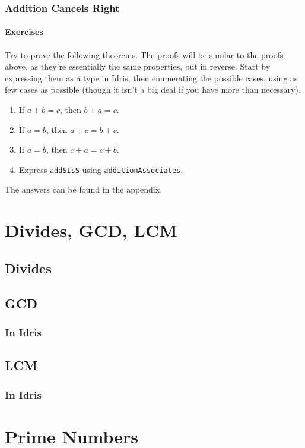 \documentclass{article}
\newcommand{\inline}[1]{\texttt{#1}}
\begin{document}
\subsubsection{Addition Cancels Right}

\paragraph{Exercises}
Try to prove the following theorems.
The proofs will be similar to the proofs above, as they're essentially the same properties, but in reverse.
Start by expressing them as a type in Idris, then enumerating the possible cases, using as few cases as possible (though it isn't a big deal if you have more than necessary).

\begin{enumerate}
    \item If $a + b = c$, then $b + a = c$.
    \item If $a = b$, then $a + c = b + c$.
    \item If $a = b$, then $c + a = c + b$.
    \item Express \inline{addSIsS} using \inline{additionAssociates}.
\end{enumerate}

The answers can be found in the appendix.

\section{Divides, GCD, LCM}
\subsection{Divides}

\subsection{GCD}
\subsubsection{In Idris}

\subsection{LCM}
\subsubsection{In Idris}

\section{Prime Numbers}
\end{document}
